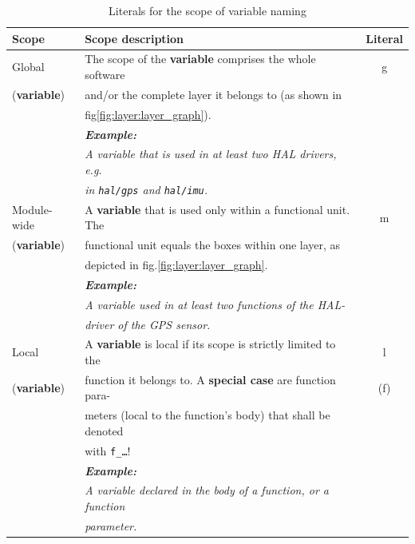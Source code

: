 \label{sec:style:varNaming:ListOfScope}
\begin{table}[h]
\begin{tabular}{l|l|c}
\hline
\textbf{Scope} 		& \textbf{Scope description}														& \textbf{Literal}\\
\hline
Global						&	The scope of the \textbf{variable} comprises the whole software			&	g\\
(\textbf{variable})				&	and/or the complete layer it belongs to (as shown in  							&	\\
									& fig\ref{fig:layer:layer_graph}).																		& \\
									&	\textit{\textbf{Example:}}																					&	\\
									& \textit{A variable that is used in at least two HAL drivers, e.g.}	&	\\
									& \textit{in \texttt{hal/gps} and \texttt{hal/imu}.}									&	\\
\hline
Module-wide				&	A \textbf{variable} that is used only within a functional unit. The 						& m\\
(\textbf{variable})				& functional unit equals the boxes within one layer, as 				&\\
									&  depicted in fig.\ref{fig:layer:layer_graph}.		&\\
									&	\textit{\textbf{Example:}} 																					&\\
									& \textit{A variable used in at least two functions of the HAL-}			&\\
									& \textit{driver of the GPS sensor.}																	&\\
\hline
Local							&	A \textbf{variable} is local if its scope is strictly limited to the 			& l \\
(\textbf{variable})				& function it belongs to.	A \textbf{special case} are function para-			 			& (f)\\
									& meters (local to the function's body) that shall be denoted					&\\
									& with \texttt{f\_\dots}!																									&\\
									&	\textit{\textbf{Example:}} 																					&\\
									& \textit{A variable declared in the body of a function, or a function}	&\\
									& \textit{parameter.}	&\\
\hline
\end{tabular}
\caption{Literals for the scope of variable naming}
\label{tab:style:varNaming:ListOfScopeVar}
\end{table}

